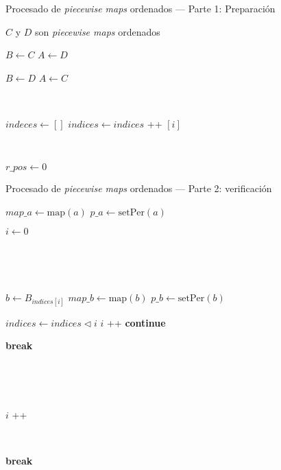\begin{algorithm}
\caption{Procesado de \textit{piecewise maps} ordenados — Parte 1: Preparación}
\label{alg:processOrdMaps1}
\begin{algorithmic}[1]
\Require $C$ y $D$ son \textit{piecewise maps} ordenados

    \State $B \gets C$
    \State $A \gets D$

         \State $B \gets D$
         \State $A \gets C$
    \EndIf
          
    \
    
    \State $indeces \gets []$ 
        \State $indices \gets indices$  \!+\!+  $[i]$
    \EndFor
        
    \
    
    \State $r\_pos \gets 0$
\EndFunction
\end{algorithmic}
\end{algorithm}

\begin{algorithm}
\caption{Procesado de \textit{piecewise maps} ordenados — Parte 2: verificación}
\label{alg:processOrdMaps2}
\begin{algorithmic}[1]
        \State  $map\_a \gets \mathrm{map}(a)$
        \State  $p\_a \gets \mathrm{setPer}(a)$
    \

        \State $i \gets 0$
                
    \
    
                
    \
    
            \State $b \gets B_{indices[i]}$
            \State  $map\_b \gets \mathrm{map}(b)$
            \State  $p\_b \gets \mathrm{setPer}(b)$
    \
    
                \State $indices \gets indices 	\triangleleft  i$
                 \State $i$ \!+\!+ 
                \State \textbf{continue}
            \EndIf

                \State \textbf{break}
            \EndIf

\
            
                \State {}
            \EndIf
        
    \
    
            \State $i$ \!+\!+ 
        \EndWhile
        
    \
    
            \State \textbf{break}
        \EndIf
    \EndFor
        
\EndFunction
\end{algorithmic}
\end{algorithm}


